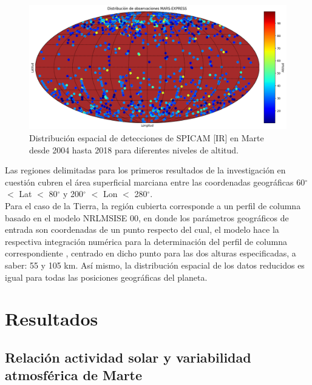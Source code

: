 \documentclass[a4paper,alpha-refs]{eSpectra}
\begin{document}
\begin{figure}
\centering
	\includegraphics[width=\textwidth, scale=2]{Imagenes/Mars_distrib.png}
    \caption{Distribuci\'on espacial de detecciones de SPICAM [IR] en Marte desde 2004 hasta 2018 para diferentes niveles de altitud.}
    \label{fig:Distrib}
\end{figure}

Las regiones delimitadas para los primeros resultados de la investigaci\'on en cuesti\'on cubren el \'area superficial marciana entre las coordenadas geogr\'aficas  60$^\circ$ $<$ Lat $<$ 80$^\circ$ y 200$^\circ$ $<$ Lon $<$ 280$^\circ$.\\

Para el caso de la Tierra, la regi\'on cubierta corresponde a un perfil de columna basado en el modelo NRLMSISE 00, en donde los par\'ametros geogr\'aficos de entrada son coordenadas de un punto respecto del cual, el modelo hace la respectiva integraci\'on num\'erica para la determinaci\'on del perfil de columna correspondiente \citep{NRLMSISE_2002, NRLMSISE_2021}, centrado en dicho punto para las dos alturas especificadas, a saber: 55 y 105 km.  As\'i mismo, la distribuci\'on espacial de los datos reducidos es igual para todas las posiciones geogr\'aficas del planeta. 


\section{Resultados}

\subsection{Relación actividad solar y variabilidad atmosférica de Marte}
\end{document}
